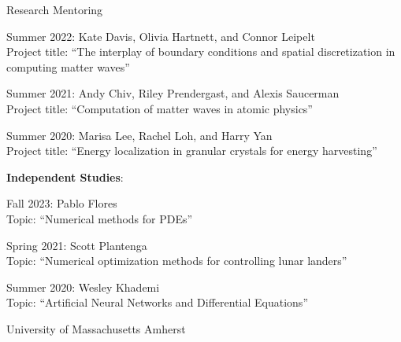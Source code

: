 \documentclass[10pt]{article} %
\newenvironment{outerlist}[1][\enskip\textbullet]%
        {\begin{itemize}[#1]}{\end{itemize}%
         \vspace{-.6\baselineskip}}
\newenvironment{innerlist}[1][\enskip\textbullet]%
        {\begin{compactitem}[#1]}{\end{compactitem}}
\begin{document}
\begin{section}{Research Mentoring}
\begin{outerlist}
\begin{innerlist}
\begin{innerlist}
\item[$\star$] Summer 2022: Kate Davis, Olivia Hartnett, and Connor Leipelt\\
Project title: ``The interplay of boundary conditions and spatial discretization in computing matter waves''
\item[$\star$] Summer 2021: Andy Chiv, Riley Prendergast, and Alexis Saucerman\\
Project title: ``Computation of matter waves in atomic physics''
\item[$\star$] Summer 2020: Marisa Lee, Rachel Loh, and Harry Yan \\
Project title: ``Energy localization in granular crystals for energy harvesting''
\end{innerlist}
\item[$\triangleright$] \textbf{Independent Studies}:
\begin{innerlist}
\item[$\star$] Fall 2023: Pablo Flores \\
Topic: ``Numerical methods for PDEs''
\item[$\star$] Spring 2021: Scott Plantenga \\
Topic: ``Numerical optimization methods for controlling lunar landers''
\item[$\star$] Summer 2020: Wesley Khademi \\
Topic: ``Artificial Neural Networks and Differential Equations''
\end{innerlist}
\end{innerlist}


\item[$\bullet$] University of Massachusetts Amherst

\begin{innerlist}


\end{innerlist}
\end{outerlist}
\end{section}
\end{document}
